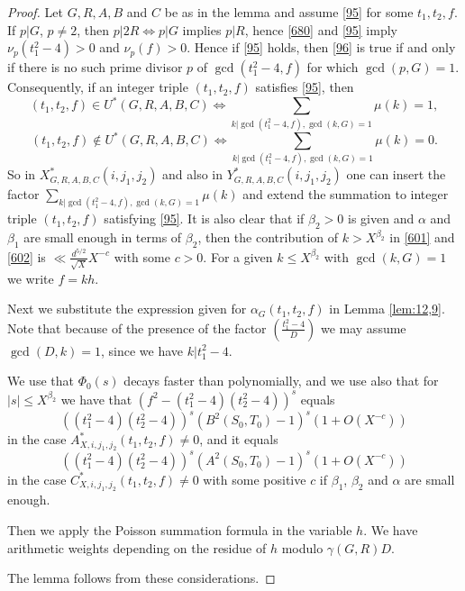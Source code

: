\documentclass[12pt]{amsart}
\theoremstyle{definition}
\numberwithin{equation}{section}
\begin{document}
\begin{proof}Let $G,R,A,B$ and $C$ be as in the lemma and
assume \eqref{95} for some $t_1,t_2,f$. If $p|G$, $p\neq 2$, then $
p|2R\Leftrightarrow p|G$ implies $p|R$,
hence \eqref{680} and \eqref{95} imply $\nu_p\left(t_1^2-4\right)
>0$ and
$\nu_p\left(f\right)>0$. Hence if \eqref{95} holds, then \eqref{96} is
true if and only if there is no such prime divisor $p$ of
$\gcd\left(t_1^2-4,f\right)$ for which $\gcd\left(p,G\right)=1$. Consequently, if an integer triple $\left
(t_1,t_2,f\right)$
satisfies \eqref{95}, then
\[\left(t_1,t_2,f\right)\in U^{\ast}\left(G,R,A,B,C\right)\Leftrightarrow
\sum_{k|\gcd\left(t_1^2-4,f\right),\gcd\left(k,G\right)=1}\mu\left
(k\right)=1,\]
\[\left(t_1,t_2,f\right)\notin U^{\ast}\left(G,R,A,B,C\right)\Leftrightarrow
\sum_{k|\gcd\left(t_1^2-4,f\right),\gcd\left(k,G\right)=1}\mu\left
(k\right)=0.\]
So in $X_{G,R,A,B,C}^{\ast}\left(i,j_1,j_2\right)$  and also in $
Y_{G,R,A,B,C}^{\ast}\left(i,j_1,j_2\right)$
one can insert the factor $\sum_{k|\gcd\left(t_1^2-4,f\right),\gcd\left
(k,G\right)=1}\mu\left(k\right)$
and extend the summation to integer triple $\left(t_1,t_2,f\right
)$
satisfying \eqref{95}. It is also clear that if $\beta_2>0$ is
given and $\alpha$ and $\beta_1$ are small enough in terms of $\beta_
2$, then
the contribution of $k>X^{\beta_2}$ in \eqref{601} and \eqref{602}
is $\ll\frac {d^{5/2}}{\sqrt {X}}X^{-c}$ with some $c>0$. For a given $
k\le X^{\beta_2}$ with
$\gcd\left(k,G\right)=1$ we write $f=kh$.


Next we substitute the expression given for $\alpha_G\left(t_1,t_
2,f\right)$
in Lemma \ref{lem:12,9}. Note that because of
the presence of the factor $\left(\frac {t_1^2-4}D\right)$ we may assume
$\gcd\left(D,k\right)=1$, since we have $k|t_1^2-4.\,$


We use that $\Phi_0\left(s\right)$ decays faster than polynomially, and we use also that for
$|s|\le X^{\beta_2}$ we have that $\left(f^2-\left(t_1^2-4\right)\left
(t_2^2-4\right)\right)^s$ equals
\[\left(\left(t_1^2-4\right)\left(t_2^2-4\right)\right)^s\left(B^
2\left(S_0,T_0\right)-1\right)^s\left(1+O\left(X^{-c}\right)\right
)\]
in the case $A_{X,i,j_1,j_2}^{\ast}\left(t_1,t_2,f\right)\neq 0$, and it equals
\[\left(\left(t_1^2-4\right)\left(t_2^2-4\right)\right)^s\left(A^
2\left(S_0,T_0\right)-1\right)^s\left(1+O\left(X^{-c}\right)\right
)\]
in the case $C_{X,i,j_1,j_2}^{\ast}\left(t_1,t_2,f\right)\neq 0$ with some positive $
c$ if $\beta_1$, $\beta_2$ and $\alpha$ are small enough.

Then we apply the Poisson summation formula in the
variable $h$. We have arithmetic weights depending on the
residue of $h$ modulo $\gamma\left(G,R\right)D$.

The lemma follows from these considerations.
\end{proof}
\end{document}
